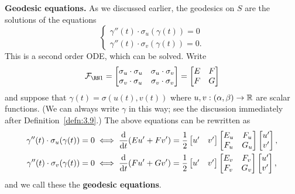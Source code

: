 {\bf Geodesic equations.} As we discussed earlier, the geodesics on $S$ are the solutions of the equations 
\[ \begin{cases}
    \gamma''(t) \cdot \sigma_u(\gamma(t)) = 0 \\ 
    \gamma''(t) \cdot \sigma_v(\gamma(t)) = 0.
\end{cases} \] 
This is a second order ODE, which can be solved. Write 
\[ \FFF = \begin{bmatrix}
    \sigma_u \cdot \sigma_u & \sigma_u \cdot \sigma_v \\ 
    \sigma_v \cdot \sigma_u & \sigma_v \cdot \sigma_v 
\end{bmatrix} = \begin{bmatrix}
    E & F \\ F & G
\end{bmatrix} \] 
and suppose that $\gamma(t) = \sigma(u(t), v(t))$ where $u, v : (\alpha, \beta) 
\to \mathbb{R}$ are scalar functions. (We can always write $\gamma$ in this way; 
see the discussion immediately after Definition~\ref{defn:3.9}.) The above 
equations can be rewritten as 
\begin{align*}
    \gamma''(t) \cdot \sigma_u(\gamma(t)) = 0 
    &\iff \frac{\rm d}{{\rm d}t} (Eu' + Fv') = \frac12 \begin{bmatrix}
        u' & v' 
    \end{bmatrix} \begin{bmatrix}
        E_u & F_u \\ F_u & G_u 
    \end{bmatrix} \begin{bmatrix}
        u' \\ v' 
    \end{bmatrix}, \\ 
    \gamma''(t) \cdot \sigma_v(\gamma(t)) = 0 
    &\iff \frac{\rm d}{{\rm d}t} (Fu' + Gv') = \frac12 \begin{bmatrix}
        u' & v' 
    \end{bmatrix} \begin{bmatrix}
        E_v & F_v \\ F_v & G_v 
    \end{bmatrix} \begin{bmatrix}
        u' \\ v' 
    \end{bmatrix},
\end{align*}
and we call these the {\bf geodesic equations}. \newpage

